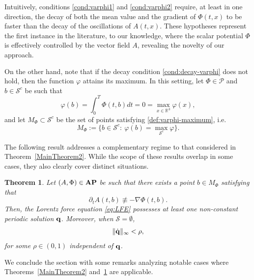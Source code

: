\documentclass{article}
\newcommand{\R}{\mathbb{R}}
\newcommand{\boP}{\mathcal{P}}
\newcommand{\boS}{\mathcal{S}}
\newcommand{\AP}{\textnormal{\textbf{AP}}}
\newtheorem{theorem}{Theorem}[section]
\theoremstyle{definition}
\begin{document}
Intuitively, conditions \eqref{cond:varphi1} and \eqref{cond:varphi2} require, at least in one direction, the decay of both the mean value and the gradient of $\Phi(t,x)$ to be faster than the  decay of the oscillations of $A(t,x)$. These hypotheses represent the first instance in the literature, to our knowledge, where the scalar potential $\Phi$ is effectively controlled by the vector field $A$, revealing the novelty of our approach.

On the other hand, note that if the decay condition \eqref{cond:decay-varphi} does not hold, then the function $\varphi$ attains its maximum. In this setting, let $\Phi\in\boP$ and $b\in\boS^c$ be such that
\begin{equation}\label{def:varphi-maximum}
	\varphi(b)=\int_0^T\Phi(t,b)dt=0=\max\limits_{x\in\R^3}\varphi(x),
\end{equation}
and let $M_\Phi\subset\boS^c$ be the set of points satisfying \eqref{def:varphi-maximum}, i.e.
\begin{equation}
M_\Phi:=\{b\in\boS^c:\ \varphi(b)=\max\limits_{\boS^c} \varphi\}.
\end{equation}

The following result addresses a complementary regime to that considered in Theorem~\ref{MainTheorem2}. While the scope of these results overlap in some cases, they also clearly cover distinct situations.

\begin{theorem}\label{MainTheorem3}
	Let $(A,\Phi)\in\AP$ be such that there exists a point $b\in M_\Phi$ satisfying that
    \begin{equation}\label{cond:nonequilibrium-ElecField}
			\partial_t A(t,b)\not\equiv-\nabla\Phi(t,b).
		\end{equation}	
    Then, the Lorentz force equation \eqref{eq:LFE} possesses at least one non-constant periodic solution ${\bf q}$. Moreover, when $\boS=\emptyset$,
\begin{equation}
	\|\dot{{\bf q}}\|_\infty<\rho,
\end{equation}
for some $\rho\in(0,1)$ independent of ${\bf q}$.
\end{theorem}


We conclude the section with some remarks analyzing notable cases where Theorems~\ref{MainTheorem2} and~\ref{MainTheorem3} are applicable.
\end{document}
